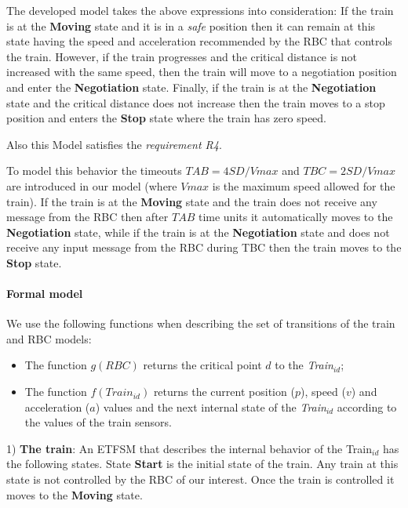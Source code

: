\documentclass{template/openetcs_article}
\begin{document}
The developed model takes the above expressions into consideration: If the train is at the \textbf{Moving} state and it is in a \textit{safe} position then it can remain at this state having the speed and acceleration recommended by the RBC that controls the train. However, if the train progresses and the critical distance is not increased with the same speed, then the train will move to a negotiation position and enter the \textbf{Negotiation} state. Finally, if the train is at the \textbf{Negotiation} state and the critical distance does not increase then the train moves to a stop position and enters the \textbf{Stop} state where the train has zero speed. 

Also this Model satisfies the \textit{requirement R4}.

To model this behavior the timeouts $TAB = 4 SD/Vmax$ and $TBC = 2 SD/Vmax$ are introduced in our model (where $Vmax$ is the maximum speed allowed for the train). If the train is at the \textbf{Moving} state and the train does not receive any message from the RBC then after $TAB$ time units it automatically moves to the \textbf{Negotiation} state, while if the train is at the \textbf{Negotiation} state and does not receive any input message from the RBC during TBC then the train moves to the \textbf{Stop} state.

\paragraph{Formal model}

We use the following functions when describing the set of transitions of the train and RBC models:

\begin{itemize}
\item The function $g(RBC)$ returns the critical point $d$ to the \textit{Train$_{id}$};
\item The function $f(Train_{id})$ returns the current position ($p$), speed ($v$) and acceleration ($a$) values and the next internal state of the \textit{Train$_{id}$} according to the values of the train sensors.
\end{itemize}

1) \textbf{The train}: An ETFSM that describes the internal behavior of the Train$_{id}$ has the following states. State \textbf{Start} is the initial state of the train. Any train at this state is not controlled by the RBC of our interest. Once the train is controlled it moves to the \textbf{Moving} state.
\end{document}
